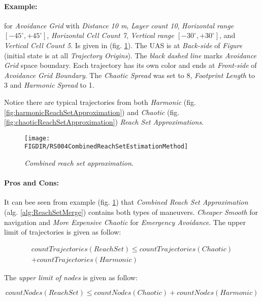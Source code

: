 \paragraph{Example:} for \emph{Avoidance Grid} with \emph{Distance 10 m}, \emph{Layer count 10}, \emph{Horizontal range $[-45^\circ,+45^\circ]$}, \emph{Horizontal Cell Count 7}, \emph{Vertical range $[-30^\circ,+30^\circ]$}, and \emph{Vertical Cell Count 5}. Is given in (fig. \ref{fig:combinedReachSetApproximation}). The UAS is at \emph{Back-side} of \emph{Figure} (initial state is at all \emph{Trajectory Origins}). The \emph{black dashed line} marks \emph{Avoidance Grid} space boundary. Each trajectory has its own color and ends at \emph{Front-side} of \emph{Avoidance Grid Boundary}. The \emph{Chaotic Spread} was set to 8, \emph{Footprint Length} to 3 and \emph{Harmonic Spread} to 1.

\begin{note}
    Notice there are typical trajectories from both \emph{Harmonic} (fig. \ref{fig:harmonicReachSetApproximation}) and \emph{Chaotic} (fig. \ref{fig:chaoticReachSetApproximation}) \emph{Reach Set Approximations}.
\end{note}

\begin{figure}[H]
    \centering
    \texttt{[image: \\FIGDIR/RS004CombinedReachSetEstimationMethod]} 
    \caption{\emph{Combined \emph{reach set} approximation}.}
    \label{fig:combinedReachSetApproximation}
\end{figure}


\paragraph{Pros and Cons:} It can bee seen from example (fig. \ref{fig:combinedReachSetApproximation}) that \emph{Combined Reach Set Approximation} (alg. \ref{alg:ReachSetMerge}) contains both types of maneuvers. \emph{Cheaper Smooth} for navigation and \emph{More Expensive Chaotic} for \emph{Emergency Avoidance}. The upper limit of trajectories is given as follow:

\begin{multline}
    countTrajectories(ReachSet) \le countTrajectories(Chaotic) \\+ countTrajectories(Harmonic)
\end{multline}

\noindent The \emph{upper limit of nodes} is given as follow:

\begin{equation}
    countNodes(ReachSet) \le countNodes(Chaotic)+ countNodes(Harmonic)
\end{equation}

